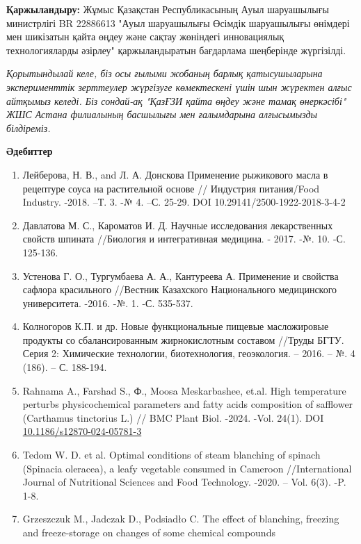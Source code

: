 {{\bfseries Қаржыландыру:} Жұмыс Қазақстан Республикасының Ауыл шаруашылығы
министрлігі BR 22886613 "Ауыл шаруашылығы Өсімдік шаруашылығы өнімдері
мен шикізатын қайта өңдеу және сақтау жөніндегі инновациялық
технологияларды әзірлеу" қаржыландыратын бағдарлама шеңберінде
жүргізілді.

\emph{Қорытындылай келе, біз осы ғылыми жобаның барлық қатысушыларына
эксперименттік зерттеулер жүргізуге көмектескені үшін шын жүректен алғыс
айтқымыз келеді. Біз сондай-ақ "ҚазҒЗИ қайта өңдеу және тамақ
өнеркәсібі" ЖШС Астана филиалының басшылығы мен ғалымдарына алғысымызды
білдіреміз.}

{\bfseries Әдебиттер}

\begin{enumerate}
\def\labelenumi{\arabic{enumi}.}
\item
  Лейберова, Н. В., and Л. А. Донскова Применение рыжикового масла в
  рецептуре соуса на растительной основе // Индустрия питания/Food
  Industry. -2018. --Т. 3. -№ 4. --С. 25-29. DOI
  10.29141/2500-1922-2018-3-4-2
\item
  Давлатова М. С., Кароматов И. Д. Научные исследования лекарственных
  свойств шпината //Биология и интегративная медицина. - 2017. -№. 10.
  -С. 125-136.
\item
  Устенова Г. О., Тургумбаева А. А., Кантуреева А. Применение и свойства
  сафлора красильного //Вестник Казахского Национального медицинского
  университета. -2016. -№. 1. -С. 535-537.
\item
  Колногоров К.П. и др. Новые функциональные пищевые масложировые
  продукты со сбалансированным жирнокислотным составом //Труды БГТУ.
  Серия 2: Химические технологии, биотехнология, геоэкология. -- 2016.
  -- №. 4 (186). -- С. 188-194.
\item
  Rahnama A., Farshad S., Ф., Moosa Meskarbashee, et.al. High
  temperature perturbs physicochemical parameters and fatty acids
  composition of safflower (Carthamus tinctorius L.) // BMC Plant Biol.
  -2024. -Vol. 24(1). DOI
  \href{https://doi.org/10.1186/s12870-024-05781-3}{10.1186/s12870-024-05781-3}
\item
  Tedom W. D. et al. Optimal conditions of steam blanching of spinach
  (Spinacia oleracea), a leafy vegetable consumed in Cameroon
  //International Journal of Nutritional Sciences and Food Technology.
  -2020. -- Vol. 6(3). -P. 1-8.
\item
  Grzeszczuk M., Jadczak D., Podsiadło C. The effect of blanching,
  freezing and freeze-storage on changes of some chemical compounds

\end{enumerate}}
